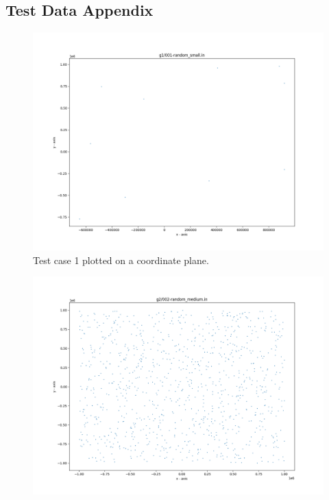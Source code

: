 \documentclass{article}
\begin{document}
\begin{appendices}
    


\section{Test Data Appendix}
\label{appendix:TestData}


\begin{figure}[H]
	\centering
	\includegraphics[scale=0.5]{code/visualizer/testdata/01.png}
	\caption{Test case 1 plotted on a coordinate plane.}
	\label{fig:01}
\end{figure}
\begin{figure}[H]
	\centering
	\includegraphics[scale=0.5]{code/visualizer/testdata/02.png}

\end{figure}
\end{appendices}
\end{document}
